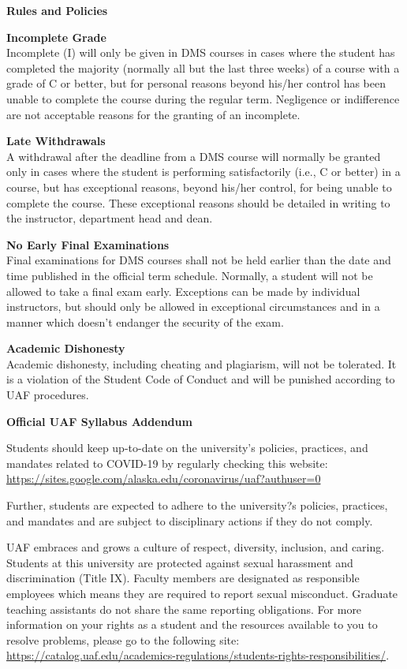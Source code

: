 \documentclass[12pt]{article}
\renewcommand{\emph}[1]{\textsf{\textbf{#1}}}
\newcommand{\localhead}[1]{\par\smallskip\textbf{#1} \smallskip\nobreak\\}%
\def\heading#1{\localhead{\large\emph{#1}}}
\def\subheading#1{\localhead{\emph{#1}}}
\begin{document}
\heading{Rules and Policies}
\vskip -20pt

\subheading{Incomplete Grade} 
Incomplete (I) will only be given in
  DMS courses in cases where
  the student has completed the majority (normally all but the last
  three weeks) of a course with a grade of C or better, but for
  personal reasons beyond his/her control has been unable to complete
  the course during the regular term. Negligence or indifference are
  not acceptable reasons for the granting of an incomplete. 

\subheading{Late Withdrawals} 
A withdrawal after the deadline from a DMS course will
  normally be granted only in cases where the student is performing
  satisfactorily (i.e., C or better) in a course, but has exceptional
  reasons, beyond his/her control, for being unable to complete the
  course. These exceptional reasons should be detailed in writing to
  the instructor, department head and dean.

\subheading{No Early Final Examinations}
Final examinations for DMS
  courses shall not be held earlier than the date and time published
  in the official term schedule. Normally, a student will not be
  allowed to take a final exam early. Exceptions can be made by
  individual instructors, but should only be allowed in exceptional
  circumstances and in a manner which doesn't endanger the security of
  the exam.

\subheading{Academic Dishonesty}
Academic dishonesty, including cheating and plagiarism, will not
be tolerated.  It is a violation of the Student Code of Conduct
and will be punished according to UAF procedures.

\newpage

\textbf{\large{Official UAF Syllabus Addendum}}
 
\hfill

 Students should keep up-to-date on the university's policies, practices, and mandates related to COVID-19 by regularly checking this website: \url{https://sites.google.com/alaska.edu/coronavirus/uaf?authuser=0}

Further, students are expected to adhere to the university?s policies, practices, and mandates and are subject to disciplinary actions if they do not comply.

 UAF embraces and grows a culture of respect, diversity, inclusion, and caring. Students at this university are protected against sexual harassment and discrimination (Title IX). Faculty members are designated as responsible employees which means they are required to report sexual misconduct. Graduate teaching assistants do not share the same reporting obligations. For more information on your rights as a student and the resources available to you to resolve problems, please go to the following site: \url{https://catalog.uaf.edu/academics-regulations/students-rights-responsibilities/}.
\end{document}
